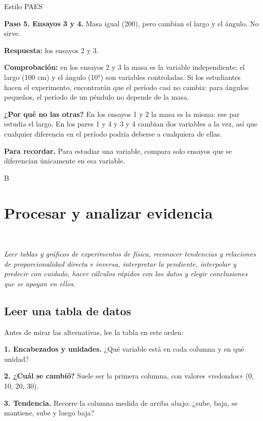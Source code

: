 \begin{elejemplo}{Estilo PAES}
{\textbf{Paso 5. Ensayos 3 y 4.} Masa igual (200), pero cambian el largo y el ángulo. No sirve.

\textbf{Respuesta:} los ensayos 2 y 3.

\textbf{Comprobación:} en los ensayos 2 y 3 la masa es la variable independiente; el largo (100 cm) y el ángulo (10°) son variables controladas. Si los estudiantes hacen el experimento, encontrarán que el período casi no cambia: para ángulos pequeños, el período de un péndulo no depende de la masa.

\textbf{¿Por qué no las otras?} En los ensayos 1 y 2 la masa es la misma: ese par estudia el largo. En los pares 1 y 4 y 3 y 4 cambian dos variables a la vez, así que cualquier diferencia en el período podría deberse a cualquiera de ellas.

\textbf{\color{cienciaD}Para recordar.} Para estudiar una variable, compara solo ensayos que se diferencian únicamente en esa variable.}{B}
\end{elejemplo}

\section[Procesar y analizar evidencia]{Procesar y analizar evidencia}
\modcomun\ \ {\color{gris}\itshape Leer tablas y gráficos de experimentos de física, reconocer tendencias y relaciones de proporcionalidad directa e inversa, interpretar la pendiente, interpolar y predecir con cuidado, hacer cálculos rápidos con los datos y elegir conclusiones que se apoyan en ellos.\par}
\subsection{Leer una tabla de datos}
Antes de mirar las alternativas, lee la tabla en este orden:

 

\textbf{1. Encabezados y unidades.} ¿Qué variable está en cada columna y en qué unidad?

 

\textbf{2. ¿Cuál se cambió?} Suele ser la primera columna, con valores «redondos» (0, 10, 20, 30).

 

\textbf{3. Tendencia.} Recorre la columna medida de arriba abajo: ¿sube, baja, se mantiene, sube y luego baja?

